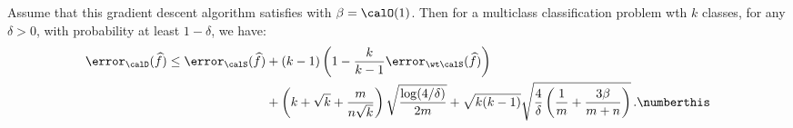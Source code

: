 \begin{theorem}\label{thm:multi_linear}
    Assume that this gradient descent algorithm satisfies 
    with $\beta=\calO(1)$.  
    Then for a multiclass classification problem wth $k$ classes, for any $\delta >0$, with probability at least $1-\delta$, we have:
    \begin{align*}
        \error_\calD(\widehat f) \le \error_\calS(\widehat f) &+ (k-1)\left(1 - \frac{k}{k-1} \error_{\wt\calS}(\widehat f) \right) \\ &+ \left(k + \sqrt{k} + \frac{m}{n\sqrt{k}} \right) \sqrt{\frac{\log(4/\delta)}{2m}} + \sqrt{k(k-1)} \sqrt{\frac{4}{\delta}\left(\frac{1}{m} +\frac{3\beta}{m+n} \right)}  \,. \numberthis \label{eq:gd_multi_error}
    \end{align*} 
\end{theorem}
